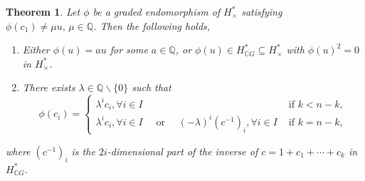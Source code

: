\documentclass{amsart}
\newtheorem{theorem}{Theorem}[section]
\begin{document}
	\begin{theorem}\label{main thm}
		Let $\phi$ be a graded endomorphism of $H^*_{\times}$ satisfying $\phi(c_1) \neq \mu u,\, \mu \in \mathbb{Q}$.  
		Then the following %
holds, \begin{enumerate}
			\item Either $\phi(u)=au$ for some $a \in \mathbb{Q}$, %
or $\phi(u) \in H^*_{\mathbb{C}G} \subseteq H^*_{\times}$ with $\phi(u)^2=0$ in %
$H^*_{\times}$.
			\item There exists $\lambda \in \mathbb Q\backslash\{0\}$ such that
			$$\phi(c_i) = \begin{cases}
				\lambda^i c_i,   \forall i \in I& \text{ if } k<n-k,\\
				\lambda^i c_i,  \forall i \in I \quad \text{ or } \quad(-\lambda)^i (c^{-1})_i,    \forall i \in I & \text{ if } k= n-k,
			\end{cases}$$
		\end{enumerate} where %
$ (c^{-1})_i $ is the $ 2i $-dimensional part of the inverse of $ c = 1 + c_1 + \cdots + c_k $ in $ H^*_{ \mathbb CG} $.
	\end{theorem}
	
	
\end{document}
